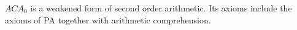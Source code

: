 \documentclass[12pt]{article}
\begin{document}
$ACA_0$ is a weakened form of second order arithmetic.  Its axioms include the axioms of PA together with arithmetic comprehension.
\end{document}
